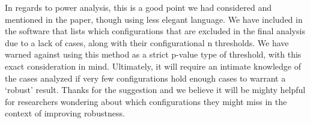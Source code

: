 \documentclass[12pt,stdletter,dateno,sigleft]{newlfm} %
\begin{document}
\begin{newlfm}
In regards to power analysis, this is a good point we had considered and mentioned in the paper, though using less elegant language. We have included in the software that lists which configurations that are excluded in the final analysis due to a lack of cases, along with their configurational n thresholds. We have warned against using this method as a strict p-value type of threshold, with this exact consideration in mind. Ultimately, it will require an intimate knowledge of the cases analyzed if very few configurations hold enough cases to warrant a `robust' result. Thanks for the suggestion and we believe it will be mighty helpful for researchers wondering about which configurations they might miss in the context of improving robustness.  \newline





\end{newlfm}
\end{document}
